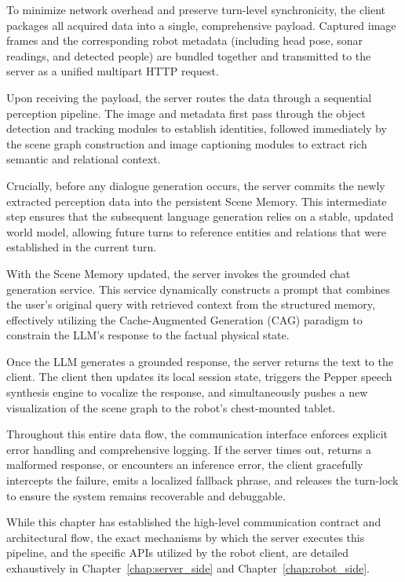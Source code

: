 To minimize network overhead and preserve turn-level synchronicity, the client packages all acquired data into a single, comprehensive payload. Captured image frames and the corresponding robot metadata (including head pose, sonar readings, and detected people) are bundled together and transmitted to the server as a unified multipart HTTP request.

Upon receiving the payload, the server routes the data through a sequential perception pipeline. The image and metadata first pass through the object detection and tracking modules to establish identities, followed immediately by the scene graph construction and image captioning modules to extract rich semantic and relational context.

Crucially, before any dialogue generation occurs, the server commits the newly extracted perception data into the persistent Scene Memory. This intermediate step ensures that the subsequent language generation relies on a stable, updated world model, allowing future turns to reference entities and relations that were established in the current turn.

With the Scene Memory updated, the server invokes the grounded chat generation service. This service dynamically constructs a prompt that combines the user's original query with retrieved context from the structured memory, effectively utilizing the Cache-Augmented Generation (CAG) paradigm to constrain the LLM's response to the factual physical state.

Once the LLM generates a grounded response, the server returns the text to the client. The client then updates its local session state, triggers the Pepper speech synthesis engine to vocalize the response, and simultaneously pushes a new visualization of the scene graph to the robot's chest-mounted tablet.

Throughout this entire data flow, the communication interface enforces explicit error handling and comprehensive logging. If the server times out, returns a malformed response, or encounters an inference error, the client gracefully intercepts the failure, emits a localized fallback phrase, and releases the turn-lock to ensure the system remains recoverable and debuggable.

While this chapter has established the high-level communication contract and architectural flow, the exact mechanisms by which the server executes this pipeline, and the specific APIs utilized by the robot client, are detailed exhaustively in Chapter~\ref{chap:server_side} and Chapter~\ref{chap:robot_side}.
